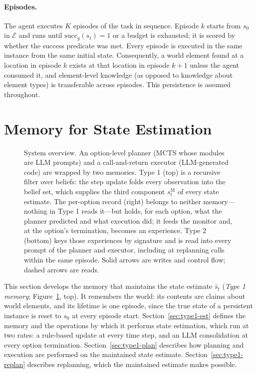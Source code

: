\documentclass[11pt]{article}
\newcommand{\calE}{\mathcal{E}}
\newcommand{\shat}{\hat{s}}
\newcommand{\sM}{s^{\mathrm{M}}}
\begin{document}
\paragraph{Episodes.}
The agent executes $K$ episodes of the task in sequence. Episode $k$ starts from $s_0$ in $\calE$ and runs until $\mathrm{succ}_g(s_t)=1$ or a budget is exhausted; it is scored by whether the success predicate was met. Every episode is executed in the same instance from the same initial state. Consequently, a world element found at a location in episode $k$ exists at that location in episode $k+1$ unless the agent consumed it, and element-level knowledge (as opposed to knowledge about element types) is transferable across episodes. This persistence is assumed throughout.


\section{Memory for State Estimation}
\label{sec:type1}

\begin{figure}[tb]
\centering
\resizebox{\textwidth}{!}{}
\caption{System overview. An option-level planner (MCTS whose modules are LLM prompts) and a call-and-return executor (LLM-generated code) are wrapped by two memories. Type 1 (top) is a recursive filter over beliefs: the step update folds every observation into the belief set, which supplies the third component $\sM_t$ of every state estimate. The per-option record (right) belongs to neither memory---nothing in Type 1 reads it---but holds, for each option, what the planner predicted and what execution did; it feeds the monitor and, at the option's termination, becomes an experience. Type 2 (bottom) keys those experiences by signature and is read into every prompt of the planner and executor, including at replanning calls within the same episode. Solid arrows are writes and control flow; dashed arrows are reads.}
\label{fig:overview}
\end{figure}

This section develops the memory that maintains the state estimate $\shat_t$ (\emph{Type 1 memory}; Figure~\ref{fig:overview}, top). It remembers the world: its contents are claims about world elements, and its lifetime is one episode, since the true state of a persistent instance is reset to $s_0$ at every episode start. Section~\ref{sec:type1-est} defines the memory and the operations by which it performs state estimation, which run at two rates: a rule-based update at every time step, and an LLM consolidation at every option termination. Section~\ref{sec:type1-plan} describes how planning and execution are performed on the maintained state estimate. Section~\ref{sec:type1-replan} describes replanning, which the maintained estimate makes possible.
\end{document}
